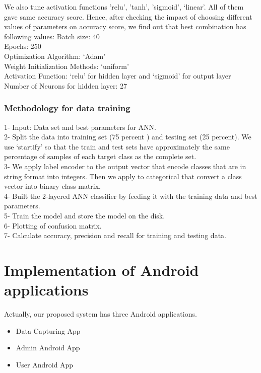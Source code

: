 We also tune activation functions { 'relu', 'tanh', 'sigmoid', ‘linear’}. All of them gave same accuracy score.
Hence, after checking the impact of choosing different values of parameters on accuracy score, we find out that best combination has following values:
Batch size: 40\\
Epochs: 250\\
Optimization Algorithm: ‘Adam’\\
Weight Initialization Methods: ‘uniform’\\
Activation Function: ‘relu’ for hidden layer and ‘sigmoid’ for output layer\\
Number of Neurons for hidden layer: 27\\

\subsubsection{Methodology for data training}

1- Input: Data set and best parameters for ANN.\\
2- Split the data into training set (75 percent ) and testing set (25 percent). We use ‘startify’ so that the train and test sets have approximately the same percentage of samples of each target class as the complete set.\\
3- We apply label encoder to the output vector that encode classes that are in string format into integers. Then we apply to categorical that convert a class vector into binary class matrix.\\
4- Built the 2-layered ANN classifier by feeding it with the training data and best parameters.\\
5- Train the model and store the model on the disk.\\
6- Plotting of confusion matrix.\\
7- Calculate accuracy, precision and recall for training and testing data.


\clearpage
\section{Implementation of Android applications}
Actually, our proposed system has three Android applications.
\begin{itemize}
\item Data Capturing App
\item Admin Android App
\item User Android App
\end{itemize}

